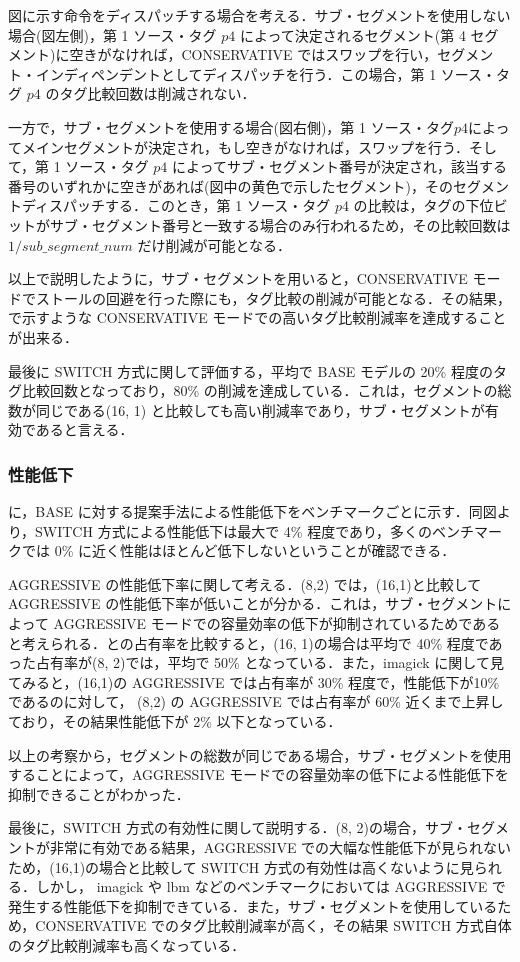 図に示す命令をディスパッチする場合を考える．サブ・セグメントを使用しない場合(図左側)，第 1 ソース・タグ $p4$ によって決定されるセグメント(第 4 セグメント)に空きがなければ，CONSERVATIVE ではスワップを行い，セグメント・インディペンデントとしてディスパッチを行う．この場合，第 1 ソース・タグ $p4$ のタグ比較回数は削減されない．

一方で，サブ・セグメントを使用する場合(図右側)，第 1 ソース・タグ$p4$によってメインセグメントが決定され，もし空きがなければ，スワップを行う．そして，第 1 ソース・タグ $p4$ によってサブ・セグメント番号が決定され，該当する番号のいずれかに空きがあれば(図中の黄色で示したセグメント)，そのセグメントディスパッチする．このとき，第 1 ソース・タグ $p4$ の比較は，タグの下位ビットがサブ・セグメント番号と一致する場合のみ行われるため，その比較回数は$1/sub\_segment\_num$ だけ削減が可能となる．

以上で説明したように，サブ・セグメントを用いると，CONSERVATIVE モードでストールの回避を行った際にも，タグ比較の削減が可能となる．その結果，で示すような CONSERVATIVE モードでの高いタグ比較削減率を達成することが出来る．

最後に SWITCH 方式に関して評価する，平均で BASE モデルの 20\% 程度のタグ比較回数となっており，80\% の削減を達成している．これは，セグメントの総数が同じである(16, 1) と比較しても高い削減率であり，サブ・セグメントが有効であると言える．

\subsubsection{性能低下}
に，BASE に対する提案手法による性能低下をベンチマークごとに示す．同図より，SWITCH 方式による性能低下は最大で 4\% 程度であり，多くのベンチマークでは 0\% に近く性能はほとんど低下しないということが確認できる．

AGGRESSIVE の性能低下率に関して考える．(8,2) では，(16,1)と比較して AGGRESSIVE の性能低下率が低いことが分かる．これは，サブ・セグメントによって AGGRESSIVE モードでの容量効率の低下が抑制されているためであると考えられる．との占有率を比較すると，(16, 1)の場合は平均で 40\% 程度であった占有率が(8, 2)では，平均で 50\% となっている．また，imagick に関して見てみると，(16,1)の AGGRESSIVE では占有率が 30\% 程度で，性能低下が10\% であるのに対して， (8,2) の AGGRESSIVE では占有率が 60\% 近くまで上昇しており，その結果性能低下が 2\% 以下となっている．

以上の考察から，セグメントの総数が同じである場合，サブ・セグメントを使用することによって，AGGRESSIVE モードでの容量効率の低下による性能低下を抑制できることがわかった．

最後に，SWITCH 方式の有効性に関して説明する．(8, 2)の場合，サブ・セグメントが非常に有効である結果，AGGRESSIVE での大幅な性能低下が見られないため，(16,1)の場合と比較して SWITCH 方式の有効性は高くないように見られる．しかし， imagick や lbm などのベンチマークにおいては AGGRESSIVE で発生する性能低下を抑制できている．また，サブ・セグメントを使用しているため，CONSERVATIVE でのタグ比較削減率が高く，その結果 SWITCH 方式自体のタグ比較削減率も高くなっている．

